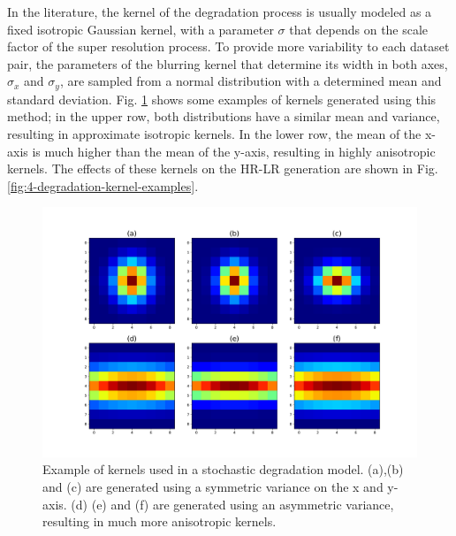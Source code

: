         In the literature, the kernel of the degradation process is usually modeled as a fixed isotropic Gaussian kernel, with a parameter $\sigma$ that depends on the scale factor of the super resolution process.
        To provide more variability to each dataset pair, the parameters of the blurring kernel that determine its width in both axes, $\sigma_x$ and $\sigma_y$, are sampled from a normal distribution with a determined mean and standard deviation. Fig. \ref{fig:4-degradation_kernels} shows some examples of kernels generated using this method; in the upper row, both distributions have a similar mean and variance, resulting in approximate isotropic kernels. In the lower row, the mean of the x-axis is much higher than the mean of the y-axis, resulting in highly anisotropic kernels. The effects of these kernels on the HR-LR generation are shown in Fig. \ref{fig:4-degradation-kernel-examples}.



        \begin{figure}[H]
                \centering
                \includegraphics[width=\linewidth]{Includes/4-degradation_kernels.pdf}
                \caption{Example of kernels used in a stochastic degradation model. (a),(b) and (c) are generated using a symmetric variance on the x and y-axis. (d) (e) and (f) are generated using an asymmetric variance, resulting in much more anisotropic kernels.}
                \label{fig:4-degradation_kernels}
            \end{figure}


